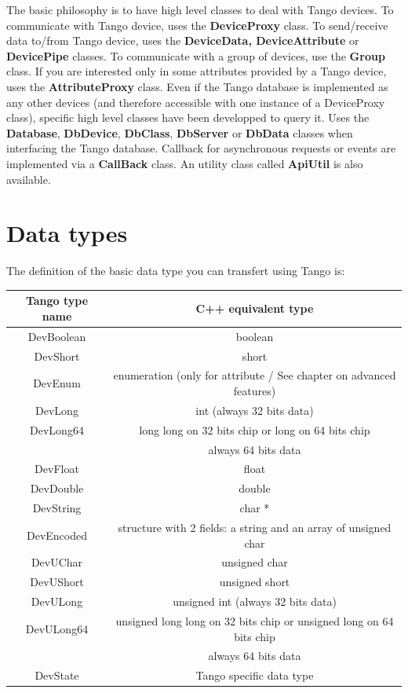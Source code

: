 \noindent The basic philosophy is to have high level classes to deal
with Tango devices. To communicate with Tango device, uses the \textbf{DeviceProxy}
class. To send/receive data to/from Tango device, uses the \textbf{DeviceData,
DeviceAttribute} or \textbf{DevicePipe}
classes. To communicate with a group of devices, use the \textbf{Group}
class. If you are interested only in some attributes provided by a
Tango device, uses the \textbf{AttributeProxy}
class. Even if the Tango database is implemented as any other devices
(and therefore accessible with one instance of a DeviceProxy class),
specific high level classes have been developped to query it. Uses
the \textbf{Database}, \textbf{DbDevice},
\textbf{DbClass}, \textbf{DbServer}
or \textbf{DbData} classes when interfacing the Tango
database. Callback for asynchronous requests or events are implemented
via a \textbf{CallBack} class. An utility class called
\textbf{ApiUtil} is also available.


\section{Data types}

The definition of the basic data type you can transfert using Tango
is:

\vspace{0.3cm}


\begin{center}
\begin{longtable}{|c|c|}
\hline 
Tango type name & C++ equivalent type\tabularnewline
\hline 
\hline 
DevBoolean & boolean\tabularnewline
\hline 
DevShort & short\tabularnewline
\hline 
DevEnum & enumeration (only for attribute / See chapter on advanced features)\tabularnewline
\hline 
DevLong & int (always 32 bits data)\tabularnewline
\hline 
DevLong64 & long long on 32 bits chip or long on 64 bits chip\tabularnewline
 & always 64 bits data\tabularnewline
\hline 
DevFloat & float\tabularnewline
\hline 
DevDouble & double\tabularnewline
\hline 
DevString & char {*}\tabularnewline
\hline 
DevEncoded & structure with 2 fields: a string and an array of unsigned char\tabularnewline
\hline 
DevUChar & unsigned char\tabularnewline
\hline 
DevUShort & unsigned short\tabularnewline
\hline 
DevULong & unsigned int (always 32 bits data)\tabularnewline
\hline 
DevULong64 & unsigned long long on 32 bits chip or unsigned long on 64 bits chip\tabularnewline
 & always 64 bits data\tabularnewline
\hline 
DevState & Tango specific data type\tabularnewline
\hline 
\end{longtable}
\par\end{center}

